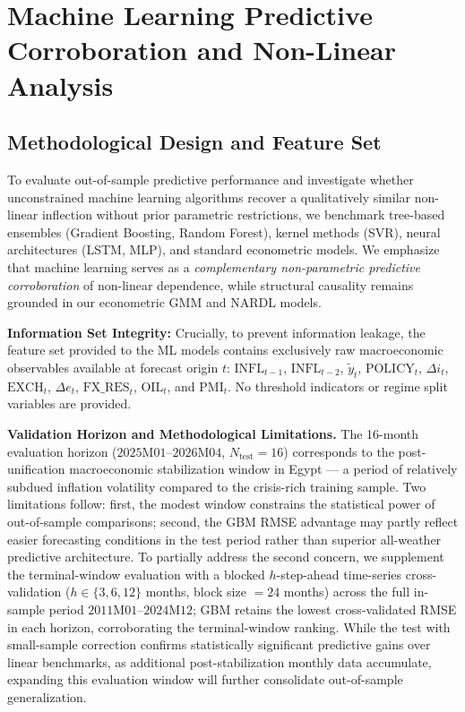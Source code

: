 \documentclass[review,12pt]{elsarticle}
\begin{document}
\section{Machine Learning Predictive Corroboration and Non-Linear Analysis}
\label{sec:ml}

\subsection{Methodological Design and Feature Set}
\label{sec:ml_justification}

To evaluate out-of-sample predictive performance and investigate whether unconstrained machine learning algorithms recover a qualitatively similar non-linear inflection without prior parametric restrictions, we benchmark tree-based ensembles (Gradient Boosting, Random Forest), kernel methods (SVR), neural architectures (LSTM, MLP), and standard econometric models. We emphasize that machine learning serves as a \textit{complementary non-parametric predictive corroboration} of non-linear dependence, while structural causality remains grounded in our econometric GMM and NARDL models.

\textbf{Information Set Integrity:} Crucially, to prevent information leakage, the feature
set provided to the ML models contains exclusively raw macroeconomic observables available
at forecast origin $t$: $\text{INFL}_{t-1}$, $\text{INFL}_{t-2}$, $\tilde{y}_t$, $\text{POLICY}_t$,
$\Delta i_t$, $\text{EXCH}_t$, $\Delta e_t$, $\text{FX\_RES}_t$, $\text{OIL}_t$, and $\text{PMI}_t$.
No threshold indicators or regime split variables are provided.

\textbf{Validation Horizon and Methodological Limitations.} The 16-month evaluation horizon ($2025\text{M}01$--$2026\text{M}04$, $N_{\text{test}} = 16$) corresponds to the post-unification macroeconomic stabilization window in Egypt --- a period of relatively subdued inflation volatility compared to the crisis-rich training sample. Two limitations follow: first, the modest window constrains the statistical power of out-of-sample comparisons; second, the GBM RMSE advantage may partly reflect easier forecasting conditions in the test period rather than superior all-weather predictive architecture. To partially address the second concern, we supplement the terminal-window evaluation with a blocked $h$-step-ahead time-series cross-validation ($h \in \{3, 6, 12\}$ months, block size $= 24$ months) across the full in-sample period $2011\text{M}01$--$2024\text{M}12$; GBM retains the lowest cross-validated RMSE in each horizon, corroborating the terminal-window ranking. While the \citet{diebold1995} test with \citet{harvey1997} small-sample correction confirms statistically significant predictive gains over linear benchmarks, as additional post-stabilization monthly data accumulate, expanding this evaluation window will further consolidate out-of-sample generalization.
\end{document}
